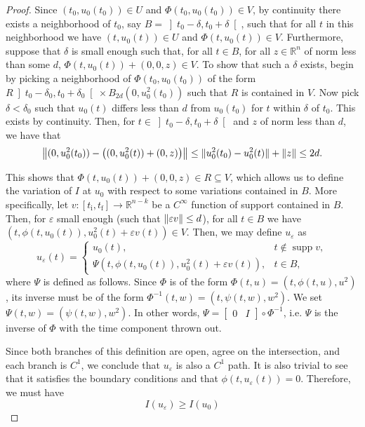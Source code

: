 \documentclass{article}
\theoremstyle{plain}
\theoremstyle{plain}
\theoremstyle{nonumberplain}
\newtheorem{proof}{Dem}
\theoremstyle{empty}
\newcommand{\R}{\mathbb{R}}
\newcommand{\tstart}{\mathrm{i}}
\newcommand{\tend}{\mathrm{f}}
\DeclarePairedDelimiter\norm{\lVert}{\rVert}
\DeclareMathOperator{\supp}{supp}
\begin{document}
\begin{proof}
Since $(t_0, u_0(t_0)) \in U$ and $\Phi(t_0, u_0(t_0)) \in V$, by continuity there exists a neighborhood of $t_0$, say $B = \left]t_0 - \delta, t_0 + \delta\right[$, such that for all $t$ in this neighborhood we have $(t,u_0(t)) \in U$ and $\Phi(t,u_0(t)) \in V$. Furthermore, suppose that $\delta$ is small enough such that, for all $t \in B$, for all $z \in \R^{n}$ of norm less than some $d$, $\Phi(t,u_0(t)) + (0,0,z) \in V$. To show that such a $\delta$ exists, begin by picking a neighborhood of $\Phi(t_0, u_0(t_0))$ of the form $R \left]t_0-\delta_0, t_0 + \delta_0\right[ \times B_{2d}(0, u_0^2(t_0))$ such that $R$ is contained in $V$. Now pick $\delta < \delta_0$ such that $u_0(t)$ differs less than $d$ from $u_0(t_0)$ for $t$ within $\delta$ of $t_0$. This exists by continuity. Then, for $t \in \left]t_0-\delta, t_0 + \delta\right[$ and $z$ of norm less than $d$, we have that
\[\norm*{(0, u_0^2(t_0)) - \left((0, u_0^2(t)) + (0, z)\right)} \leq \norm{u_0^2(t_0) - u_0^2(t)} + \norm z \leq 2d.\]

This shows that $\Phi(t,u_0(t)) + (0,0,z) \in R \subseteq V$, which allows us to define the variation of $I$ at $u_0$ with respect to some variations contained in $B$. More specifically, let $v : [t_\tstart, t_\tend] \to \R^{n-k}$ be a $C^\infty$ function of support contained in $B$. Then, for $\varepsilon$ small enough (such that $\norm{\varepsilon v} \leq d$), for all $t \in B$ we have $(t, \phi(t,u_0(t)), u_0^2(t) + \varepsilon v(t)) \in V$. Then, we may define $u_\varepsilon$ as
\[
u_\varepsilon(t) =
\begin{cases}
u_0(t), & t \not \in \supp v,\\
\Psi(t, \phi(t,u_0(t)), u_0^2(t) + \varepsilon v(t)), & t \in B,
\end{cases}
\]
where $\Psi$ is defined as follows. Since $\Phi$ is of the form $\Phi(t,u) = (t, \phi(t,u), u^2)$, its inverse must be of the form $\Phi^{-1}(t,w) = (t, \psi(t,w), w^2)$. We set $\Psi(t,w) = (\psi(t,w), w^2)$. In other words, $\Psi = \begin{bmatrix} 0 & I \end{bmatrix} \circ \Phi^{-1}$, i.e. $\Psi$ is the inverse of $\Phi$ with the time component thrown out.

Since both branches of this definition are open, agree on the intersection, and each branch is $C^1$, we conclude that $u_\varepsilon$ is also a $C^1$ path. It is also trivial to see that it satisfies the boundary conditions and that $\phi(t, u_\varepsilon(t)) = 0$. Therefore, we must have
\[I(u_\varepsilon) \geq I(u_0)\]


\end{proof}
\end{document}
